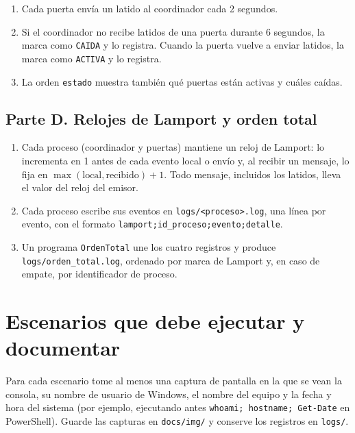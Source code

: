 \documentclass[11pt,a4paper]{article}
\begin{document}
\begin{enumerate}[label=C\arabic*.]
	\item Cada puerta envía un latido al coordinador cada 2 segundos.
	\item Si el coordinador no recibe latidos de una puerta durante 6 segundos, la marca como \texttt{CAIDA} y lo registra. Cuando la puerta vuelve a enviar latidos, la marca como \texttt{ACTIVA} y lo registra.
	\item La orden \texttt{estado} muestra también qué puertas están activas y cuáles caídas.
\end{enumerate}

\subsection*{Parte D. Relojes de Lamport y orden total}

\begin{enumerate}[label=D\arabic*.]
	\item Cada proceso (coordinador y puertas) mantiene un reloj de Lamport: lo incrementa en 1 antes de cada evento local o envío y, al recibir un mensaje, lo fija en $\max(\text{local}, \text{recibido}) + 1$. Todo mensaje, incluidos los latidos, lleva el valor del reloj del emisor.
	\item Cada proceso escribe sus eventos en \texttt{logs/<proceso>.log}, una línea por evento, con el formato \texttt{lamport;id\_proceso;evento;detalle}.
	\item Un programa \texttt{OrdenTotal} une los cuatro registros y produce \texttt{logs/orden\_total.log}, ordenado por marca de Lamport y, en caso de empate, por identificador de proceso.
\end{enumerate}

\section{Escenarios que debe ejecutar y documentar}

Para cada escenario tome al menos una captura de pantalla en la que se vean la consola, su nombre de usuario de Windows, el nombre del equipo y la fecha y hora del sistema (por ejemplo, ejecutando antes \texttt{whoami; hostname; Get-Date} en PowerShell). Guarde las capturas en \texttt{docs/img/} y conserve los registros en \texttt{logs/}.
\end{document}
